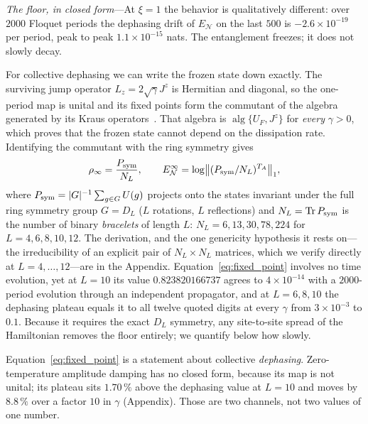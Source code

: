 \documentclass[aps,prl,reprint,amsmath,amssymb,floatfix]{revtex4-2}
\newcommand{\EN}{E_{\mathcal N}}
\newcommand{\ENinf}{E_{\mathcal N}^{\infty}}
\newcommand{\Psym}{P_{\rm sym}}
\begin{document}
{\it The floor, in closed form}---At $\xi=1$ the behavior is qualitatively
different: over $2000$ Floquet periods the dephasing drift of $\EN$ on the last
$500$ is $-2.6\times10^{-19}$ per period, peak to peak $1.1\times10^{-15}$
nats. The entanglement freezes; it does not slowly decay.

For collective dephasing we can write the frozen state down exactly. The
surviving jump operator $L_z=2\sqrt\gamma J^z$ is Hermitian and diagonal, so
the one-period map is unital and its fixed points form the commutant of the
algebra generated by its Kraus operators~\cite{Kribs2003,Arias2002}. That
algebra is $\operatorname{alg}\{U_F,J^z\}$ for \emph{every} $\gamma>0$, which
proves that the frozen state cannot depend on the dissipation rate.
Identifying the commutant with the ring symmetry gives
\begin{equation}
\label{eq:fixed_point}
\rho_\infty=\frac{\Psym}{N_L} ,
\qquad
\ENinf=\log\bigl\lVert(\Psym/N_L)^{T_A}\bigr\rVert_1 ,
\end{equation}
where $\Psym=\lvert G\rvert^{-1}\sum_{g\in G}U(g)$ projects onto the states
invariant under the full ring symmetry group $G=D_L$ ($L$ rotations, $L$
reflections) and $N_L=\Tr\Psym$ is the number of binary \emph{bracelets} of
length $L$: $N_L=6,13,30,78,224$ for $L=4,6,8,10,12$. The derivation, and the
one genericity hypothesis it rests on---the irreducibility of an explicit pair
of $N_L\times N_L$ matrices, which we verify directly at $L=4,\dots,12$---are
in the Appendix. Equation~\eqref{eq:fixed_point} involves no time evolution,
yet at $L=10$ its value $0.823820166737$ agrees to $4\times10^{-14}$ with a
$2000$-period evolution through an independent propagator, and at $L=6,8,10$
the dephasing plateau equals it to all twelve quoted digits at every $\gamma$
from $3\times10^{-3}$ to $0.1$. Because it requires the exact $D_L$ symmetry,
any site-to-site spread of the Hamiltonian removes the floor entirely; we
quantify below how slowly.

Equation~\eqref{eq:fixed_point} is a statement about collective
\emph{dephasing}. Zero-temperature amplitude damping has no closed form,
because its map is not unital; its plateau sits $1.70\,\%$ above the dephasing
value at $L=10$ and moves by $8.8\,\%$ over a factor $10$ in $\gamma$
(Appendix). Those are two channels, not two values of one number.
\end{document}
